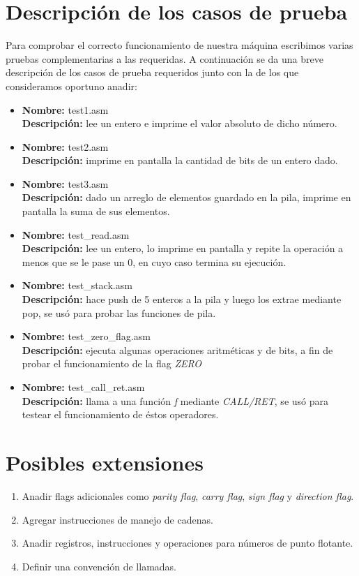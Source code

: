 \documentclass[a4paper,12pt]{article}
\begin{document}
\section{Descripci\'on de los casos de prueba}

Para comprobar el correcto funcionamiento de nuestra m\'aquina escribimos varias pruebas complementarias a las requeridas. A continuaci\'on se da una breve descripci\'on de los casos de prueba requeridos junto con la de los que consideramos oportuno anadir:
\begin{itemize}
\item
\textbf{Nombre:} test1.asm\\
\textbf{Descripci\'on:} lee un entero e imprime el valor absoluto de dicho n\'umero.
\item
\textbf{Nombre:} test2.asm\\
\textbf{Descripci\'on:} imprime en pantalla la cantidad de bits de un entero dado.
\item
\textbf{Nombre:} test3.asm\\
\textbf{Descripci\'on:} dado un arreglo de elementos guardado en la pila, imprime en pantalla la suma de sus elementos.
\item
\textbf{Nombre:} test\_read.asm\\
\textbf{Descripci\'on:} lee un entero, lo imprime en pantalla y repite la operaci\'on a menos que se le pase un 0, en cuyo caso termina su ejecuci\'on.
\item
\textbf{Nombre:} test\_stack.asm\\
\textbf{Descripci\'on:} hace push de 5 enteros a la pila y luego los extrae mediante pop, se us\'o para probar las funciones de pila.
\item
\textbf{Nombre:} test\_zero\_flag.asm\\
\textbf{Descripci\'on:} ejecuta algunas operaciones aritm\'eticas y de bits, a fin de probar el funcionamiento de la flag \emph{ZERO}
\item
\textbf{Nombre:} test\_call\_ret.asm\\
\textbf{Descripci\'on:} llama a una funci\'on \emph f mediante \emph{CALL/RET}, se us\'o para testear el funcionamiento de \'estos operadores.
\end{itemize}

\section{Posibles extensiones}

\begin{enumerate}
\item Anadir flags adicionales como \emph{parity flag}, \emph{carry flag}, \emph{sign flag} y \emph{direction flag}.
\item Agregar instrucciones de manejo de cadenas.
\item Anadir registros, instrucciones y operaciones para n\'umeros de punto flotante.
\item Definir una convenci\'on de llamadas.
\end{enumerate}
\end{document}
